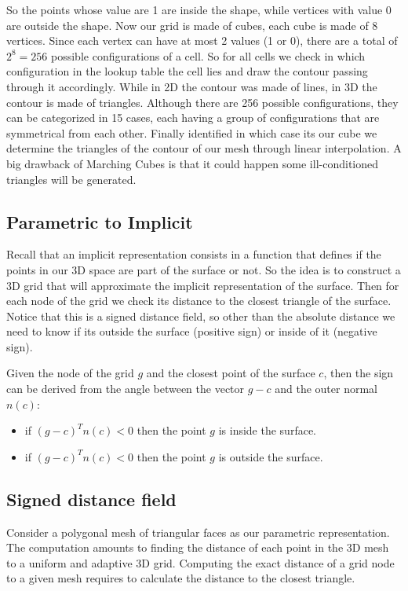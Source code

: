 So the points whose value are 1 are inside the shape, while vertices with value 0 are outside the shape. Now our grid is made of cubes, each cube is made of 8 vertices. Since each vertex can have at most 2 values (1 or 0), there are a total of $2^8 = 256$ possible configurations of a cell. So for all cells we check in which configuration in the lookup table the cell lies and draw the contour passing through it accordingly. While in 2D the contour was made of lines, in 3D the contour is made of triangles. Although there are 256 possible configurations, they can be categorized in 15 cases, each having a group of configurations that are symmetrical from each other. Finally identified in which case its our cube we determine the triangles of the contour of our mesh through linear interpolation. A big drawback of Marching Cubes is that it could happen some ill-conditioned triangles will be generated.

\subsection{Parametric to Implicit}
Recall that an implicit representation consists in a function that defines if the points in our 3D space are part of the surface or not. So the idea is to construct a 3D grid that will approximate the implicit representation of the surface. Then for each node of the grid we check its distance to the closest triangle of the surface. Notice that this is a signed distance field, so other than the absolute distance we need to know if its outside the surface (positive sign) or inside of it (negative sign).\par
Given the node of the grid $g$ and the closest point of the surface $c$, then the sign can be derived from the angle between the vector $g - c$ and the outer normal $n(c)$:
\begin{itemize}
    \item if $(g-c)^{T}n(c) < 0$ then the point $g$ is inside the surface.
    \item if $(g-c)^{T}n(c) < 0$ then the point $g$ is outside the surface.
\end{itemize}

\subsection{Signed distance field}
Consider a polygonal mesh of triangular faces as our parametric representation. The computation amounts to finding the distance of each point in the 3D mesh to a uniform and adaptive 3D grid. Computing the exact distance of a grid node to a given mesh requires to calculate the distance to the closest triangle.


